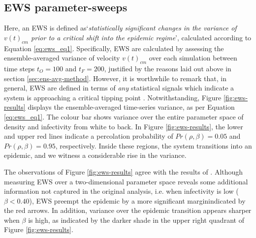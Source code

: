 \subsection{EWS parameter-sweeps}
\label{section:ews_slm}

Here, an EWS is defined as`\textit{statistically significant changes in the variance of $v(t)_{cm}$ prior to a critical shift into the epidemic regime}', calculated according to Equation \ref{eq:ews_eq1}. Specifically, EWS are calculated by assessing the ensemble-averaged variance of velocity $v(t)_{cm}$ over each simulation between time steps $t_O=100$ and $t_F=200$, justified by the reasons laid out above in section \ref{sec:ens-avg-method}. However, it is worthwhile to remark that, in general, EWS are defined in terms of \textit{any} statistical signals which indicate a system is approaching a critical tipping point \cite{scheffer2009early}. Notwithstanding, Figure \ref{fig:ews-results} displays the ensemble-averaged time-series variance, as per Equation \ref{eq:ews_eq1}. The colour bar shows variance over the entire parameter space of density and infectivity from white to back. In Figure \ref{fig:ews-results}, the lower and upper red lines indicate a percolation probability of $Pr(\rho, \beta)=0.05$ and $Pr(\rho, \beta)=0.95$, respectively. Inside these regions, the system transitions into an epidemic, and we witness a considerable rise in the variance.

The observations of Figure \ref{fig:ews-results} agree with the results of \cite{OROZCOFUENTES201912}. 
Although measuring EWS over a two-dimensional parameter space reveals some additional information not captured in the original analysis, i.e. when infectivity is low ($\beta<0.40$), EWS preempt the epidemic by a more significant margin\textemdash indicated by the red arrows.
In addition, variance over the epidemic transition appears sharper when $\beta$ is high, as indicated by the darker shade in the upper right quadrant of Figure \ref{fig:ews-results}.

